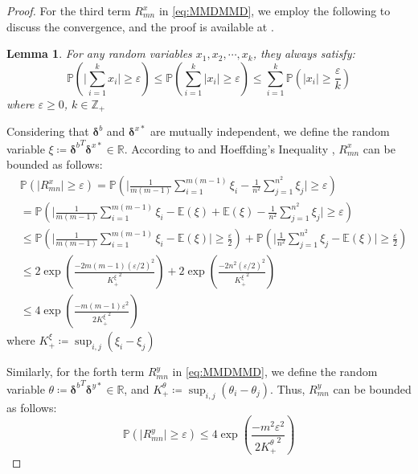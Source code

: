 \documentclass{article}
\newtheorem{lemma}{Lemma}[section]
\begin{document}
\begin{proof}
For the third term $R_{mn}^x$ in \eqref{eq:MMDMMD}, we employ the following  to discuss the convergence, and the proof is available at .
\begin{lemma}\label{le:1/nepsilon}
    For any random variables $x_1, x_2, \cdots, x_k$, they always satisfy:
    \begin{equation}
        \mathbb{P}\left(\Bigg|\sum_{i=1}^{k}x_i\Bigg| \geq \varepsilon\right) \leq \mathbb{P}\left(\sum_{i=1}^{k}|x_i| \geq \varepsilon\right) \leq \sum_{i=1}^{k}\mathbb{P}\left(|x_i| \geq \frac{\varepsilon}{k}\right)
    \end{equation}
    where $\varepsilon \geq 0$, $k \in \mathbb{Z}_+$
\end{lemma}
Considering that $\bm{\delta}^b$ and $\bm{\delta}^{x*}$ are mutually independent, we define the random variable $\xi \coloneqq {\bm{\delta}^b}^T\bm{\delta}^{x*} \in \mathbb{R}$.
According to  and Hoeffding's Inequality \cite{hoeffding1994probability}, $R_{mn}^x$ can be bounded as follows:
\begin{equation}\label{eq:3rd}
    \begin{aligned}
        & \mathbb{P}(\big|R_{mn}^x\big| \geq \varepsilon) = \mathbb{P}\left(\Bigg| \frac{1}{m(m-1)}\sum_{i=1}^{m(m-1)}\xi_i - \frac{1}{n^2}\sum_{j=1}^{n^2}\xi_j\Bigg| \geq \varepsilon\right) \\
        & = \mathbb{P}\left(\Bigg| \frac{1}{m(m-1)}\sum_{i=1}^{m(m-1)}\xi_i - \mathbb{E}(\xi) + \mathbb{E}(\xi) - \frac{1}{n^2}\sum_{j=1}^{n^2}\xi_j\Bigg| \geq \varepsilon\right) \\
        & \leq \mathbb{P}\left(\Bigg| \frac{1}{m(m-1)}\sum_{i=1}^{m(m-1)}\xi_i - \mathbb{E}(\xi) \Bigg| \geq \frac{\varepsilon}{2}\right) + \mathbb{P}\left(\Bigg| \frac{1}{n^2}\sum_{j=1}^{n^2}\xi_j - \mathbb{E}(\xi) \Bigg| \geq \frac{\varepsilon}{2}\right) \\
        & \leq 2\exp\left(\frac{-2m(m-1)(\varepsilon/2)^2}{{K_+^\xi}^2}\right) + 2\exp\left(\frac{-2n^2(\varepsilon/2)^2}{{K_+^\xi}^2}\right) \\
        & \leq 4\exp\left(\frac{-m(m-1)\varepsilon^2}{2{K_+^\xi}^2}\right)
    \end{aligned}
\end{equation}
where $K_+^\xi \coloneqq \sup_{i,j} (\xi_i - \xi_j)$

Similarly, for the forth term $R_{mn}^y$ in \eqref{eq:MMDMMD}, we define the random variable $\theta \coloneqq {\bm{\delta}^b}^T\bm{\delta}^{y*} \in \mathbb{R}$, 
and $K_+^\theta \coloneqq \sup_{i,j} (\theta_i - \theta_j)$. 
Thus, $R_{mn}^y$ can be bounded as follows:
\begin{equation}\label{eq:4th}
    \mathbb{P}(\big|R_{mn}^y\big| \geq \varepsilon) \leq 4\exp\left(\frac{-m^2\varepsilon^2}{2{K_+^\theta}^2}\right)
\end{equation}


\end{proof}
\end{document}
